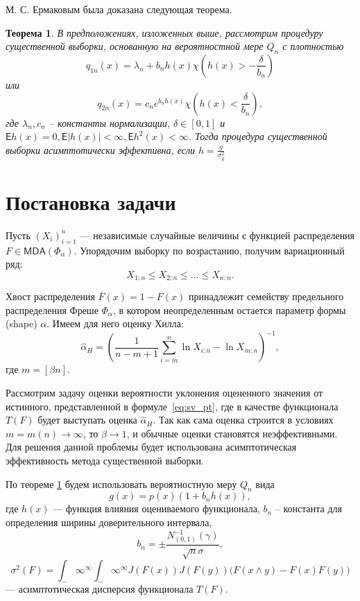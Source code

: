 \documentclass[12pt, specialist, subf, substylefile = spbu.rtx]{disser}
\newtheorem{theorem}{Теорема}
\newcommand{\Expect}{\mathsf{E}}
\newcommand{\MDA}{\mathsf{MDA}}
\begin{document}
М. С. Ермаковым была доказана следующая теорема.
\begin{theorem}\label{th:erm}
В предположениях, изложенных выше, рассмотрим процедуру существенной выборки, основанную на вероятностной мере $Q_n$ с плотностью 
$$
q_{1n}(x)=\lambda_n+b_nh(x)\chi\left(h(x)>-\frac{\delta}{b_n}\right)
$$
или
$$
q_{2n}(x)=c_ne^{b_nh(x)} \chi\left(h(x)<\frac{\delta}{b_n}\right),
$$
где $\lambda_n, c_n$ -- константы нормализации, $\delta \in [0, 1]$ и $\Expect h(x)=0, \Expect|h(x)|<\infty, \Expect h^2(x)< \infty$. Тогда процедура существенной выборки асимптотически эффективна, если $h=\frac{g}{\sigma^2_g}$

\end{theorem}


\section{Постановка задачи}

Пусть $(X_i)_{i=1}^n$ --- независимые случайные величины с функцией распределения $F \in \MDA(\Phi_\alpha)$. Упорядочим выборку по возрастанию, получим вариационный ряд:
$$
X_{1:n} \le X_{2:n} \le ... \le X_{n:n}.
$$

Хвост распределения $\bar{F}(x)=1-F(x)$ принадлежит семейству предельного распределения Фреше $\Phi_\alpha$, в котором неопределенным остается параметр формы (shape) $\alpha$. Имеем для него оценку Хилла:
\begin{equation}\label{eq:hill_est}
\hat{\alpha}_H=
\left(\frac{1}{n-m+1} \sum\limits_{i=m}^n \ln X_{i:n}-\ln X_{m:n} \right)^{-1},
\end{equation}
где $m=[\beta n]$.


Рассмотрим задачу оценки вероятности уклонения оцененного значения от истинного, представленной в формуле~\eqref{eq:sv_pt}, где в качестве функционала $T(F)$ будет выступать оценка $\hat{\alpha}_H$. Так как сама оценка строится в условиях $m=m(n) \to \infty$, то $\beta \to 1$, и обычные оценки становятся неэффективными. Для решения данной проблемы будет использована асимптотическая эффективность метода существенной выборки.

По теореме \ref{th:erm} будем использовать вероятностную меру $Q_n$ вида
\begin{equation}\label{eq:g_common}
g(x)=p(x)(1+b_nh(x)),
\end{equation}
где $h(x)$ --- функция влияния оцениваемого функционала, $b_n$ -- константа для определения ширины доверительного интервала, 
\begin{equation}\label{eq:bn}
b_n = \pm\frac{N_{(0,1)}^{-1}(\gamma)}{\sqrt{n}\sigma},
\end{equation}
\begin{equation}\label{eq:asymdisp}
\sigma^2(F)= \int_-\infty^\infty \int_-\infty^\infty J(F(x)) J(F(y))\big( F(x \wedge y)-F(x)F(y)\big)
\end{equation}
--- асимптотическая дисперсия функционала $T(F)$.
\end{document}
